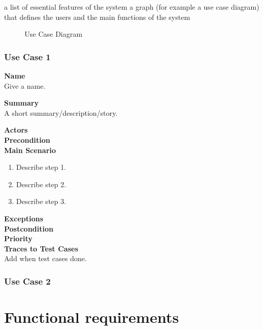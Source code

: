 \documentclass[12pt]{article}
\begin{document}
    a list of essential features of the system
    a graph (for example a use case diagram) that defines the users and the main functions of the system

\begin{figure}[htbp]
\caption{Use Case Diagram}
\label{fig:use-case-diagram}
\end{figure}

\subsubsection{Use Case 1} \label{uc:1}

\noindent
{\bf Name}\\
Give a name.

\noindent
{\bf Summary}\\
A short summary/description/story.

\noindent
{\bf Actors}\\

\noindent
{\bf Precondition}\\

\noindent
{\bf Main Scenario}\\
\vspace*{-0.2in}
\begin{enumerate}
\item Describe step 1.
\item Describe step 2.
\item Describe step 3.
\end{enumerate}

\noindent
{\bf Exceptions}\\

\noindent
{\bf Postcondition}\\

\noindent
{\bf Priority}\\

\noindent
{\bf Traces to Test Cases}\\
Add when test cases done.

\subsubsection{Use Case 2} \label{uc:2}

\section{Functional requirements}

\end{document}

